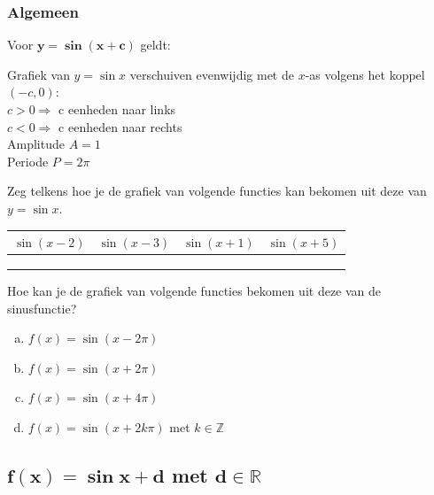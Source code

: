 \documentclass[a4paper,12pt,twoside]{article}
\begin{document}
\subsubsection*{Algemeen}
\begin{mdframed}
Voor $\boldsymbol{y=\sin (x+c)}$ geldt:
  \begin{center}
    Grafiek van $y=\sin x$ verschuiven evenwijdig met de $x$-as volgens het koppel $(-c, 0)$:\\
    $c>0 \Rightarrow$ c eenheden naar links\\
    $c<0 \Rightarrow$ c eenheden naar rechts \\
    Amplitude $A = 1$\\
    Periode $P = 2\pi$
  \end{center}
\end{mdframed}

\begin{oefening}
Zeg telkens hoe je de grafiek van volgende functies kan bekomen uit deze van $y=\sin x$.
\begin{center}
  \begin{tabular}{c|c|c|c}
    $\sin (x-2)$ & $\sin (x-3)$ & $\sin (x+1)$ & $\sin (x+5)$\\
    \hline
    \hspace*{3cm} &\hspace*{3cm}&\hspace*{3cm}&\hspace*{3cm}
    \\
    &&&
    \\
    &&&
  \end{tabular}
\end{center}
\end{oefening}

\begin{oefening}
Hoe kan je de grafiek van volgende functies bekomen uit deze van de sinusfunctie?
\begin{enumerate}[(a)]
  \item $f(x)=\sin(x-2\pi)$
  \item $f(x)=\sin(x+2\pi)$
  \item $f(x)=\sin(x+4\pi)$
  \item $f(x)=\sin(x+2k\pi)$ met $k\in\mathbb{Z}$
\end{enumerate}
\end{oefening}

\needspace{5cm}
\subsection{$\boldsymbol{f(x)=\sin x + d}$ met $\boldsymbol{d\in \mathbb{R}}$}
\end{document}
